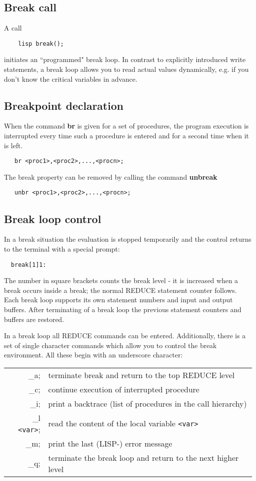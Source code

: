\subsection{Break call}
A call
\begin{verbatim}
    lisp break();
\end{verbatim}
initiates an ``programmed" break loop. In contrast to
explicitly introduced write statements, a break loop
allows you to read actual values dynamically, e.g. if
you don't know the critical variables in advance.

\subsection{Breakpoint declaration}
When the command {\bf br} is given for a set of
procedures, the program execution is interrupted every
time such a procedure is entered and for a second time
when it is left.
\begin{verbatim}
   br <proc1>,<proc2>,...,<procn>;
\end{verbatim}
The break property can be removed by calling the command
{\bf unbreak}
\begin{verbatim}
   unbr <proc1>,<proc2>,...,<procn>;
\end{verbatim}

\subsection{Break loop control}
In a break situation the evaluation  is stopped temporarily
and the control returns to the terminal with a special prompt:
\begin{verbatim}
  break[1]1:
\end{verbatim}
The number in square brackets counts the break level - it is
increased when a break occurs inside a break; the normal
{\small REDUCE} statement counter follows. Each break loop supports its
own statement numbers and input and output buffers.
After terminating of a break loop the
previous statement counters and buffers are restored.

In a break loop all {\small REDUCE} commands can be
entered. Additionally, there is a set of single character commands
which allow you to control the break environment. All these
begin with an underscore character:

\begin{tabular}{r  l}
   \_a;    &  terminate break  and return to the top  REDUCE level\\
   \_c;    &  continue execution of interrupted procedure\\
   \_i;    &  print a backtrace (list of procedures in the call hierarchy)\\
   \_l \verb+<var>+;& read the content of the local variable  \verb+<var>+\\
   \_m;    &  print the last (LISP-) error message\\
   \_q;    &  terminate the break loop and return to the next higher level\\
\end{tabular}

